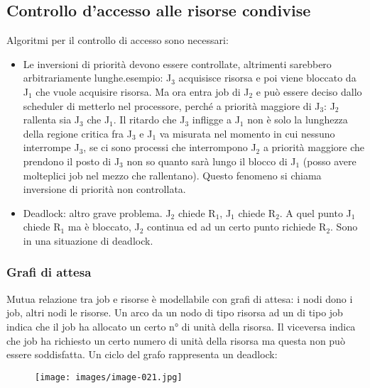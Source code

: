 \documentclass[12pt, oneside]{extbook}
\begin{document}
\subsection{Controllo d'accesso alle risorse condivise}
Algoritmi per il controllo di accesso sono necessari:
\begin{itemize}
\item Le inversioni di priorità devono essere controllate, altrimenti sarebbero arbitrariamente lunghe.esempio: J$_{3}$ acquisisce risorsa e poi viene bloccato da J$_{1}$ che vuole acquisire risorsa. Ma ora entra job di J$_{2}$ e può essere deciso dallo scheduler di metterlo nel processore, perché a priorità maggiore di J$_{3}$: J$_{2}$ rallenta sia J$_{3}$ che J$_{1}$. Il ritardo che J$_{3}$ infligge a J$_{1}$ non è solo la lunghezza della regione critica fra J$_{3}$ e J$_{1}$ va misurata nel momento in cui nessuno interrompe J$_{3}$, se ci sono processi che interrompono J$_{2}$ a priorità maggiore che prendono il posto di J$_{3}$ non so quanto sarà lungo il blocco di J$_{1}$ (posso avere molteplici job nel mezzo che rallentano). Questo fenomeno si chiama inversione di priorità non controllata.
\item Deadlock: altro grave problema. J$_{2}$ chiede R$_{1}$, J$_{1}$ chiede R$_{2}$. A quel punto J$_{1}$ chiede R$_{1}$ ma è bloccato, J$_{2}$ continua ed ad un certo punto richiede R$_{2}$. Sono in una situazione di deadlock.
\end{itemize}
\subsubsection{Grafi di attesa}
Mutua relazione tra job e risorse è modellabile con grafi di attesa: i nodi dono i job, altri nodi le risorse. Un arco da un nodo di tipo risorsa ad un di tipo job indica che il job ha allocato un certo n° di unità della risorsa. Il viceversa indica che job ha richiesto un certo numero di unità della risorsa ma questa non può essere soddisfatta. Un ciclo del grafo rappresenta un deadlock:\\
\begin{figure}[!h]
\centering
\texttt{[image: images/image-021.jpg]}
\end{figure}
\end{document}

